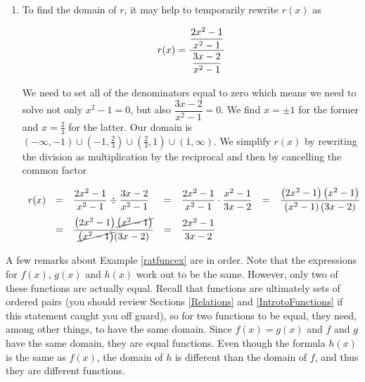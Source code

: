 {\begin{enumerate}
\[ \begin{array}{rclcl}

h(x) & = & \dfrac{2x^2-1}{x^2-1} - \dfrac{3x-2}{x^2-1} & = & \dfrac{\left(2x^2-1\right) - \left(3x-2\right)}{x^2-1} \\ [.15in]
     & = & \dfrac{2x^2-1 - 3x+2}{x^2-1} & = &  \dfrac{2x^2 - 3x+1}{x^2-1} \\ [.15in]
     & = & \dfrac{(2x-1)(x-1)}{(x+1)(x-1)} & = & \dfrac{(2x-1)\cancel{(x-1)}}{(x+1)\cancel{(x-1)}} \\ [.15in]
     & = & \dfrac{2x-1}{x+1} & & \\
\end{array} \]

\item  To find the domain of $r$, it may help to temporarily rewrite $r(x)$ as

\[ r(x) = \dfrac{\dfrac{2x^2-1}{x^2-1} }{\dfrac{3x-2}{x^2-1}\vphantom{\left(\dfrac{X}{X}\right)}}\]

We need to set all of the denominators equal to zero which means we need to solve not only  $x^2-1= 0$, but also $\dfrac{3x-2}{x^2-1}=0$.  We find $x = \pm 1$ for the former and $x= \frac{2}{3}$ for the latter.  Our domain is $(-\infty, -1) \cup \left(-1,\frac{2}{3}\right) \cup \left(\frac{2}{3},1\right) \cup (1, \infty)$.  We simplify $r(x)$ by rewriting the division as multiplication by the reciprocal and then by cancelling the common factor

\[ \begin{array}{rclclcl}

r(x) & = & \dfrac{2x^2-1}{x^2-1} \div \dfrac{3x-2}{x^2-1} & = & \dfrac{2x^2-1}{x^2-1} \cdot \dfrac{x^2-1}{3x-2} & = & \dfrac{\left(2x^2-1\right)\left(x^2-1\right)}{\left(x^2-1\right)(3x-2)} \\ [.15in]
     & = & \dfrac{\left(2x^2-1\right)\cancel{\left(x^2-1\right)}}{\cancel{\left(x^2-1\right)}(3x-2)} & = & \dfrac{2x^2-1}{3x-2} & & \\ 
\end{array}\]

\end{enumerate}
}

\medskip

A few remarks about Example \ref{ratfuncex} are in order. Note that the expressions for $f(x)$, $g(x)$ and $h(x)$ work out to be the same.  However, only two of these functions are actually equal.  Recall that functions are ultimately sets of ordered pairs (you should review Sections \ref{Relations} and \ref{IntrotoFunctions} if this statement caught you off guard), so for two functions to be equal, they need, among other things, to have the same domain.  Since $f(x) = g(x)$ and $f$ and $g$ have the same domain, they are equal functions.  Even though the formula $h(x)$ is the same as $f(x)$, the domain of $h$ is different than the domain of $f$, and thus they are different functions.  

